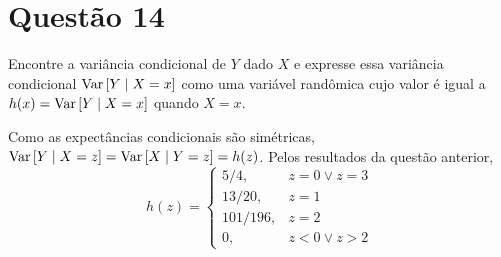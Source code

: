 \section{Questão 14}

Encontre a variância condicional de $Y$ dado $X$ e expresse essa variância condicional $\mathrm{Var}\left[Y\mid X=x\right]$
como uma variável randômica cujo valor é igual a 
$h(x) = \mathrm{Var}\left[Y\mid X = x\right]$ quando $X = x$.

\begin{respostas}
    Como as expectâncias condicionais são simétricas, 
    $\mathrm{Var}\left[Y\mid X = z\right] = \mathrm{Var}\left[X\mid Y = z\right] = h(z)$.
    Pelos resultados da questão anterior,
    \begin{equation}
        h(z) = 
        \begin{cases}
            5/4,     & z=0 \vee z=3 \\
            13/20,   & z=1 \\ 
            101/196, & z=2 \\ 
            0,       & z<0 \vee z>2
        \end{cases}
    \end{equation}
\end{respostas}